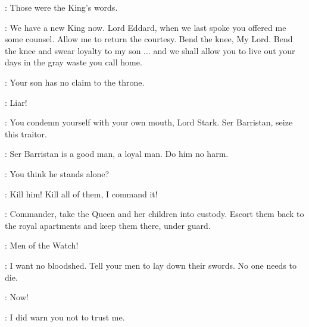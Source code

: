 \SELMY: Those were the King's words. 

\CERSEI: We have a new King now. Lord Eddard, when we last spoke you offered me some counsel. Allow me to return the courtesy. Bend the knee, My Lord. Bend the knee and swear loyalty to my son $\ldots$ and we shall allow you to live out your days in the gray waste you call home. 

\NED: Your son has no claim to the throne. 

\JOFFREY: Liar! 

\CERSEI: You condemn yourself with your own mouth, Lord Stark. Ser Barristan, seize this traitor. 

\NED:  Ser Barristan is a good man, a loyal man. Do him no harm. 

\CERSEI: You think he stands alone? 

\JOFFREY: Kill him! Kill all of them, I command it! 

\NED: Commander, take the Queen and her children into custody. Escort them back to the royal apartments and keep them there, under guard. 

\GOLDCLOAK: Men of the Watch! 

\NED: I want no bloodshed. Tell your men to lay down their swords. No one needs to die. 

\GOLDCLOAK: Now! 



\LITTLEFINGER: I did warn you not to trust me. 


